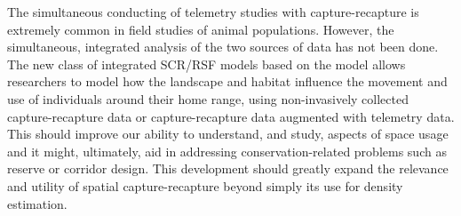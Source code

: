The simultaneous conducting of telemetry studies with capture-recapture
is extremely common in field studies of animal populations. However,
the simultaneous, integrated analysis of the two sources of data has
not been done.  The new class of integrated SCR/RSF models based on
the \citet{royle_etal:2012mee} model allows researchers to model how
the landscape and habitat influence the movement and use of
individuals around their home range, using non-invasively collected
capture-recapture data or capture-recapture data augmented with
telemetry data.  This should improve our ability to understand, and
study, aspects of space usage and it might, ultimately, aid in
addressing conservation-related problems such as reserve or corridor
design. This development should greatly expand the relevance and utility of
spatial capture-recapture beyond simply its use for density
estimation.






























